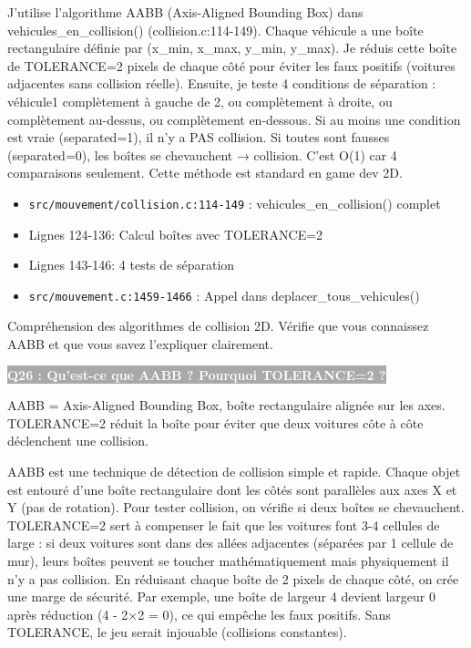 \documentclass[12pt,a4paper]{article}
\newcommand{\question}[1]{%
    \vspace{0.5cm}
    \noindent\colorbox{darkgray}{\textcolor{white}{\textbf{#1}}}
    \vspace{0.3cm}
}
\begin{document}
\begin{reponse_longue}
J'utilise l'algorithme AABB (Axis-Aligned Bounding Box) dans vehicules\_en\_collision() (collision.c:114-149). Chaque véhicule a une boîte rectangulaire définie par (x\_min, x\_max, y\_min, y\_max). Je réduis cette boîte de TOLERANCE=2 pixels de chaque côté pour éviter les faux positifs (voitures adjacentes sans collision réelle). Ensuite, je teste 4 conditions de séparation : véhicule1 complètement à gauche de 2, ou complètement à droite, ou complètement au-dessus, ou complètement en-dessous. Si au moins une condition est vraie (separated=1), il n'y a PAS collision. Si toutes sont fausses (separated=0), les boîtes se chevauchent → collision. C'est O(1) car 4 comparaisons seulement. Cette méthode est standard en game dev 2D.
\end{reponse_longue}

\begin{reference_code}
\begin{itemize}
    \item \texttt{src/mouvement/collision.c:114-149} : vehicules\_en\_collision() complet
    \item Lignes 124-136: Calcul boîtes avec TOLERANCE=2
    \item Lignes 143-146: 4 tests de séparation
    \item \texttt{src/mouvement.c:1459-1466} : Appel dans deplacer\_tous\_vehicules()
\end{itemize}
\end{reference_code}

\begin{objectif_prof}
Compréhension des algorithmes de collision 2D. Vérifie que vous connaissez AABB et que vous savez l'expliquer clairement.
\end{objectif_prof}

\question{Q26 : Qu'est-ce que AABB ? Pourquoi TOLERANCE=2 ?}

\begin{reponse_courte}
AABB = Axis-Aligned Bounding Box, boîte rectangulaire alignée sur les axes. TOLERANCE=2 réduit la boîte pour éviter que deux voitures côte à côte déclenchent une collision.
\end{reponse_courte}

\begin{reponse_longue}
AABB est une technique de détection de collision simple et rapide. Chaque objet est entouré d'une boîte rectangulaire dont les côtés sont parallèles aux axes X et Y (pas de rotation). Pour tester collision, on vérifie si deux boîtes se chevauchent. TOLERANCE=2 sert à compenser le fait que les voitures font 3-4 cellules de large : si deux voitures sont dans des allées adjacentes (séparées par 1 cellule de mur), leurs boîtes peuvent se toucher mathématiquement mais physiquement il n'y a pas collision. En réduisant chaque boîte de 2 pixels de chaque côté, on crée une marge de sécurité. Par exemple, une boîte de largeur 4 devient largeur 0 après réduction (4 - 2×2 = 0), ce qui empêche les faux positifs. Sans TOLERANCE, le jeu serait injouable (collisions constantes).
\end{reponse_longue}
\end{document}
